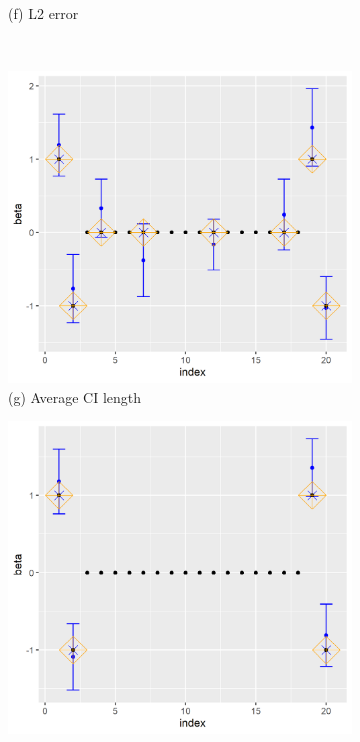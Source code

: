 \begin{figure}[ht!]
\begin{subfigure}[b]{.32\columnwidth}
    \caption{(f) L2 error}
\end{subfigure}
\\
\centering
\begin{subfigure}[b]{.32\columnwidth} 
    \includegraphics[width=\columnwidth]{../../plot/split_50_1_1.png}
    \caption{(g) Average CI length}
\end{subfigure}
\hfill
\centering
\begin{subfigure}[b]{.32\columnwidth} 
    \includegraphics[width=\columnwidth]{../../plot/p1_50_1_1.png}

\end{subfigure}
\end{figure}
